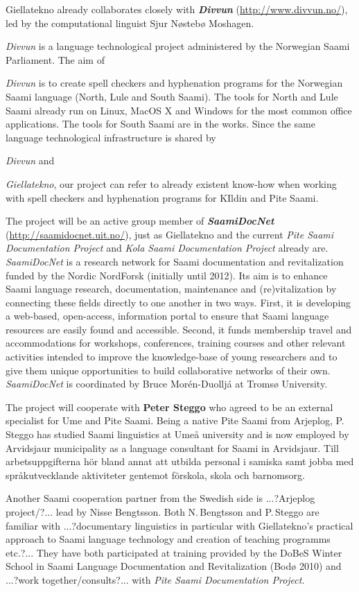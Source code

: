 \documentclass[a4paper,12pt]{article}
\begin{document}
Giellatekno already collaborates closely with \textit{\textbf{Divvun}} (\url{http://www.divvun.no/}), led by the computational linguist Sjur Nøstebø Moshagen. {\textit{Divvun} is a language technological project administered by the Norwegian Saami Parliament. The aim of {\textit{Divvun} is to create spell checkers and hyphenation programs for the Norwegian Saami language (North, Lule and South Saami). The tools for North and Lule Saami already run on Linux, MacOS X and Windows for the most common office applications. The tools for South Saami are in the works. Since the same language technological infrastructure is shared by {\textit{Divvun} and {\textit{Giellatekno}, our project can refer to already existent know-how when working with spell checkers and hyphenation programs for KIldin and Pite Saami.

The project will be an active group member of \textit{\textbf{SaamiDocNet}} (\url{http://saamidocnet.uit.no/}), just as Giellatekno and the current {\it Pite Saami Documentation Project} and {\it Kola Saami Documentation Project} already are. {\it SaamiDocNet} is a research network for Saami documentation and revitalization funded by the Nordic NordForsk (initially until 2012). Its aim is to enhance Saami language research, documentation, maintenance and (re)vitalization by connecting these fields directly to one another in two ways. First, it is developing a web-based, open-access, information portal to ensure that Saami language resources are easily found and accessible. Second, it funds membership travel and accommodations for workshops, conferences, training courses and other relevant activities intended to improve the knowledge-base of young researchers and to give them unique opportunities to build collaborative networks of their own. {\it SaamiDocNet} is coordinated by Bruce Morén-Duolljá at Tromsø University.
 
The project will cooperate with \textbf{Peter Steggo} who agreed to be an external specialist for Ume and Pite Saami. Being a native Pite Saami from Arjeplog, P.\,Steggo has studied Saami linguistics at Umeå university and is now employed by Arvidsjaur municipality as a language consultant for Saami in Arvidsjaur. Till arbetsuppgifterna hör bland annat att utbilda personal i samiska samt jobba med språkutvecklande aktiviteter gentemot förskola, skola och barnomsorg.%

Another Saami cooperation partner from the Swedish side is ...?Arjeplog project/?... lead by Nisse Bengtsson. Both N.\,Bengtsson and P.\,Steggo are familiar with ...?documentary linguistics in particular with Giellatekno's practical approach to Saami language technology and creation of teaching programms etc.?... They have both participated at training provided by the DoBeS Winter School in Saami Language Documentation and Revitalization (Bodø 2010) and ...?work together/consults?... with {\it Pite Saami Documentation Project}. 

}}}}
\end{document}
